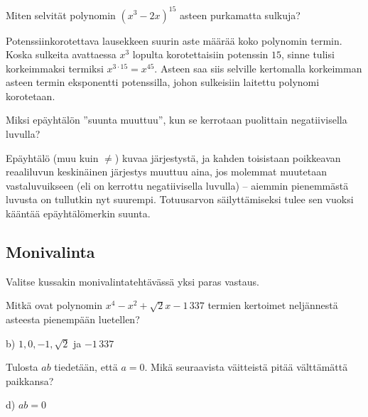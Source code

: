 \begin{tehtava}
Miten selvität polynomin $(x^3-2x)^{15}$ asteen purkamatta sulkuja?
	\begin{vastaus}
Potenssiinkorotettava lausekkeen suurin aste määrää koko polynomin termin. Koska sulkeita avattaessa $x^3$ lopulta korotettaisiin potenssin $15$, sinne tulisi korkeimmaksi termiksi $x^{3\cdot 15}=x^{45}$. Asteen saa siis selville kertomalla korkeimman asteen termin eksponentti potenssilla, johon sulkeisiin laitettu polynomi korotetaan.
	\end{vastaus}
\end{tehtava}

\begin{tehtava}
Miksi epäyhtälön ''suunta muuttuu'', kun se kerrotaan puolittain negatiivisella luvulla?
	\begin{vastaus}
Epäyhtälö (muu kuin $\neq$) kuvaa järjestystä, ja kahden toisistaan poikkeavan reaaliluvun keskinäinen järjestys muuttuu aina, jos molemmat muutetaan vastaluvuikseen (eli on kerrottu negatiivisella luvulla) -- aiemmin pienemmästä luvusta on tullutkin nyt suurempi. Totuusarvon säilyttämiseksi tulee sen vuoksi kääntää epäyhtälömerkin suunta.
	\end{vastaus}
\end{tehtava}

\subsection*{Monivalinta}

Valitse kussakin monivalintatehtävässä yksi paras vastaus.

\begin{tehtava}
Mitkä ovat polynomin $x^4-x^2+\sqrt{2}x-1\,337$ termien kertoimet neljännestä asteesta pienempään luetellen?
	\begin{vastaus}
	b) $1, 0, -1, \sqrt{2}$ ja $-1\,337$
	\end{vastaus}
\end{tehtava}

\begin{tehtava}
Tulosta $ab$ tiedetään, että $a = 0$. Mikä seuraavista väitteistä pitää välttämättä paikkansa?
		\begin{vastaus}
d) $ab = 0$
	\end{vastaus}
\end{tehtava}


